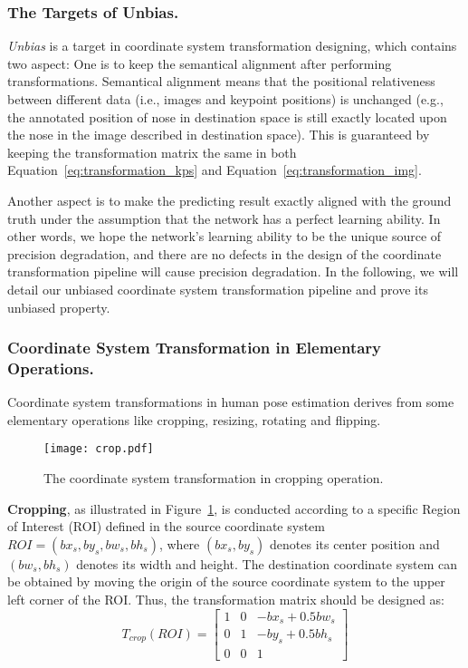 \documentclass[10pt,journal,compsoc]{IEEEtran}
\begin{document}
\subsubsection{The Targets of Unbias.}
\textit{Unbias} is a target in coordinate system transformation designing, which contains two aspect: One is to keep the semantical alignment after performing transformations. Semantical alignment means that the positional relativeness  between different data (i.e., images and keypoint positions) is unchanged (e.g., the annotated position of nose in destination space is still exactly located upon the nose in the image described in destination space). This is guaranteed by keeping the transformation matrix the same in both Equation~\ref{eq:transformation_kps} and Equation~\ref{eq:transformation_img}.

Another aspect is to make the predicting result exactly aligned with the ground truth under the assumption that the network has a perfect learning ability. In other words, we hope the network's learning ability to be the unique source of precision degradation, and there are no defects in the design of the coordinate transformation pipeline will cause precision degradation. In the following, we will detail our unbiased coordinate system transformation pipeline and prove its unbiased property.


\subsubsection{Coordinate System Transformation in Elementary Operations.}
Coordinate system transformations in human pose estimation derives from some elementary operations like cropping, resizing, rotating and flipping.

\begin{figure}[h]
    \centering
    \texttt{[image: crop.pdf]}
    \caption{The coordinate system transformation in cropping operation. }
    \label{fig:crop}
\end{figure}

\textbf{Cropping}, as illustrated in Figure~\ref{fig:crop}, is conducted according to a specific Region of Interest (ROI) defined in the source coordinate system $ROI = (bx_s,by_s,bw_s,bh_s)$, where $(bx_s,by_s)$ denotes its center position and $(bw_s,bh_s)$ denotes its width and height. The destination coordinate system can be obtained by moving the origin of the source coordinate system to the upper left corner of the ROI. Thus, the transformation matrix should be designed as:
\begin{equation}
    T_{crop}(ROI) =
    \begin{bmatrix} 1 & 0 & -bx_s+0.5bw_s \\
                    0 & 1 & -by_s+0.5bh_s \\
                    0 & 0 &1 \end{bmatrix}
\end{equation}
\end{document}
